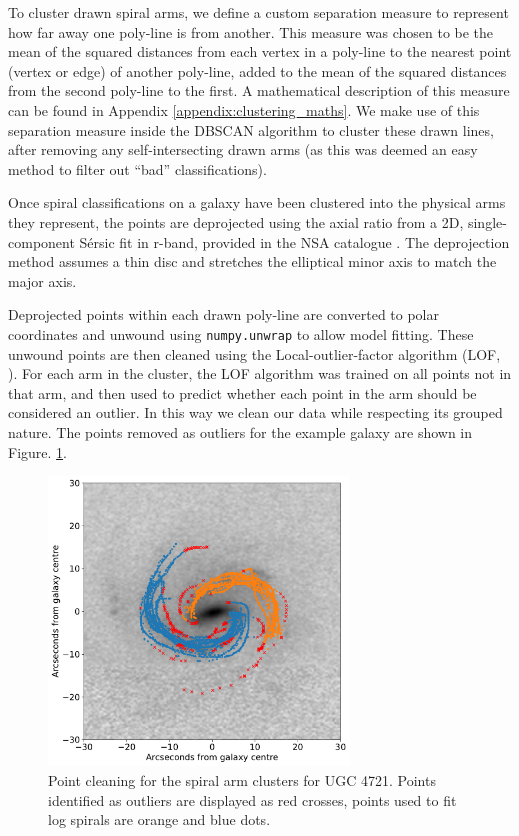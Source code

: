 \documentclass[../main.tex]{subfiles}
\begin{document}
To cluster drawn spiral arms, we define a custom separation measure to represent how far away one poly-line is from another. This measure was chosen to be the mean of the squared distances from each vertex in a poly-line to the nearest point (vertex or edge) of another poly-line, added to the mean of the squared distances from the second poly-line to the first. A mathematical description of this measure can be found in Appendix \ref{appendix:clustering_maths}. We make use of this separation measure inside the DBSCAN algorithm to cluster these drawn lines, after removing any self-intersecting drawn arms (as this was deemed an easy method to filter out ``bad'' classifications).

Once spiral classifications on a galaxy have been clustered into the physical arms they represent, the points are deprojected using the axial ratio from a 2D, single-component S\'ersic fit in r-band, provided in the NSA catalogue \citep{2011AJ....142...31B}. The deprojection method assumes a thin disc and stretches the elliptical minor axis to match the major axis.

Deprojected points within each drawn poly-line are converted to polar coordinates and unwound using \texttt{numpy.unwrap} to allow model fitting. These unwound points are then cleaned using the Local-outlier-factor algorithm (LOF, \citealt{local-outlier-factor}). For each arm in the cluster, the LOF algorithm was trained on all points not in that arm, and then used to predict whether each point in the arm should be considered an outlier. In this way we clean our data while respecting its grouped nature. The points removed as outliers for the example galaxy are shown in Figure. \ref{fig:LOF_cleaning}.

\begin{figure}
  \includegraphics[width=8cm]{images__method/LOF_cleaning.pdf}
  \caption{Point cleaning for the spiral arm clusters for UGC 4721. Points identified as outliers are displayed as red crosses, points used to fit log spirals are orange and blue dots.}
  \label{fig:LOF_cleaning}
\end{figure}
\end{document}
